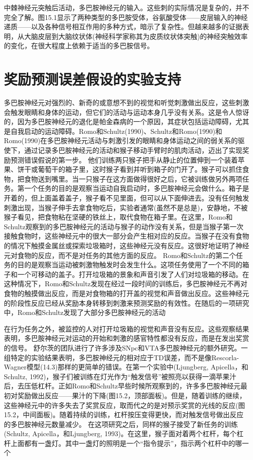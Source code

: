 中棘神经元突触后活动，多巴胺神经元的输入。这些刺的实际情况是复杂的，并不完全了解。图15.1显示了两种类型的多巴胺受体，谷氨酸受体——皮层输入的神经递质——以及各种信号相互作用的多种方式，暗示了复杂性。但越来越多的证据表明，从大脑皮层到大脑纹状体(神经科学家称其为皮质纹状体突触)的神经突触效率的变化，在很大程度上依赖于适当的多巴胺信号。

\section{奖励预测误差假设的实验支持}

多巴胺神经元对强烈的、新奇的或意想不到的视觉和听觉刺激做出反应，这些刺激会触发眼睛和身体的运动，但它们的活动与运动本身几乎没有关系。这是令人惊讶的，因为多巴胺神经元的退化是帕金森病的一个原因，其症状包括运动障碍，尤其是自我启动的运动障碍。Romo和Schultz(1990)、Schultz和Romo(1990)和Romo(1990)在多巴胺神经元活动与刺激引发的眼睛和身体运动之间的弱关系的驱使下，通过记录多巴胺神经元的活动和猴子移动手臂时的肌肉活动，迈出了实现奖励预测错误假说的第一步。
他们训练两只猴子把手从静止的位置伸到一个装着苹果、饼干或葡萄干的箱子里，这时猴子看到并听到箱子的门开了。猴子可以抓住食物，把食物送到嘴里。当一只猴子在这方面做得很好之后，它被训练做另外两项任务。第一个任务的目的是观察当运动自我启动时，多巴胺神经元会做什么。箱子是开着的，但上面盖着盖子，猴子看不见里面，但可以从下面伸进去。没有任何触发刺激出现，当猴子伸手去拿食物吃后，实验者通常(虽然不是总是)，安静地，不被猴子看见，把食物粘在坚硬的铁丝上，取代食物在箱子里。在这里，Romo和Schultz观察到的多巴胺神经元的活动与猴子的动作没有关系，但是当猴子第一次接触食物时，这些神经元中的很大一部分会产生相对应的反应。当猴子在没有食物的情况下触摸金属丝或探索垃圾箱时，这些神经元没有反应。这很好地证明了神经元对食物的反应，而不是对任务的其他方面的反应。
Romo和Schultz的第二个任务的目的是观察当运动被刺激物触发时会发生什么。这项任务使用了一个不同的箱子和一个可移动的盖子。打开垃圾箱的景象和声音引发了人们对垃圾箱的移动。在这种情况下，Romo和Schultz发现在经过一段时间的训练后，多巴胺神经元不再对食物的触摸做出反应，而是对食物箱的打开盖的视觉和声音做出反应。这些神经元的阶段性反应已经从奖励本身转移到刺激来预测奖励的有效性。在随后的一项研究中，Romo和Schultz发现了大部分多巴胺神经元的活动

在行为任务之外，被监控的人对打开垃圾箱的视觉和声音没有反应。这些观察结果表明，多巴胺神经元对运动的开始和刺激的感官特性都没有反应，而是在发出奖赏的信号。
舒尔茨的团队进行了许多涉及SNpc和VTA多巴胺神经元的额外研究。一组特定的实验结果表明，多巴胺神经元的相对应于TD误差，而不是像Rescorla-Wagner模型(14.3)那样的更简单的错误。在第一个实验中(Ljungberg, Apicella，和Schultz, 1992)，猴子们被训练在灯光作为“触发信号”被照亮以获得一滴苹果汁后，去压低杠杆。正如Romo和Schultz早些时候所观察到的，许多多巴胺神经元最初对奖励做出反应——果汁的下降(图15.2，顶部面板)。但是，随着训练的继续，这些神经元中的许多失去了奖赏反应，取而代之的是对预示奖赏的光线的反应(图15.2，中间面板)。随着持续的训练，杠杆按压变得更快，而对触发信号做出反应的多巴胺神经元数量减少。
在这项研究之后，同样的猴子接受了新任务的训练(Schultz, Apicella，和Ljungberg, 1993)。在这里，猴子面对着两个杠杆，每个杠杆上面都有一盏灯。其中一盏灯的照明是一个“指令提示”，指示两个杠杆中的哪一个
 


